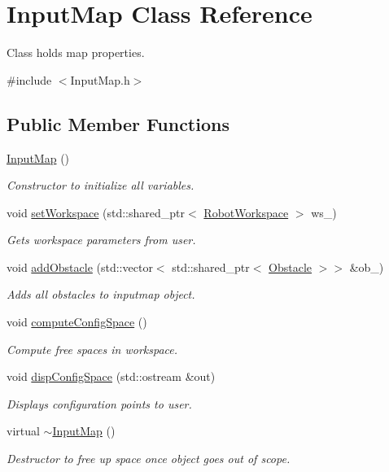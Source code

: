 \hypertarget{classInputMap}{}\section{Input\+Map Class Reference}
\label{classInputMap}


Class holds map properties.  




{\ttfamily \#include $<$Input\+Map.\+h$>$}

\subsection*{Public Member Functions}
\begin{DoxyCompactItemize}
\item 
\hyperlink{classInputMap_aa79c436a267244b2151a564a56ac8b38}{Input\+Map} ()
\begin{DoxyCompactList}\small\item\em Constructor to initialize all variables. \end{DoxyCompactList}\item 
void \hyperlink{classInputMap_a5a60fff36f356c56c3787ffd1f7c05a2}{set\+Workspace} (std\+::shared\+\_\+ptr$<$ \hyperlink{classRobotWorkspace}{Robot\+Workspace} $>$ ws\+\_\+)
\begin{DoxyCompactList}\small\item\em Gets workspace parameters from user. \end{DoxyCompactList}\item 
void \hyperlink{classInputMap_a7a9eebead6fa8ebf4967c67c4b40db97}{add\+Obstacle} (std\+::vector$<$ std\+::shared\+\_\+ptr$<$ \hyperlink{classObstacle}{Obstacle} $>$$>$ \&ob\+\_\+)
\begin{DoxyCompactList}\small\item\em Adds all obstacles to inputmap object. \end{DoxyCompactList}\item 
void \hyperlink{classInputMap_a156a93dc41197c553f85e1b3634298ed}{compute\+Config\+Space} ()
\begin{DoxyCompactList}\small\item\em Compute free spaces in workspace. \end{DoxyCompactList}\item 
void \hyperlink{classInputMap_a98e7e9db9901085b4c3796a3e4757eff}{disp\+Config\+Space} (std\+::ostream \&out)
\begin{DoxyCompactList}\small\item\em Displays configuration points to user. \end{DoxyCompactList}\item 
virtual \hyperlink{classInputMap_a6f246c9507a85fd0ea168f5c72a2912e}{$\sim$\+Input\+Map} ()
\begin{DoxyCompactList}\small\item\em Destructor to free up space once object goes out of scope. \end{DoxyCompactList}\end{DoxyCompactItemize}
